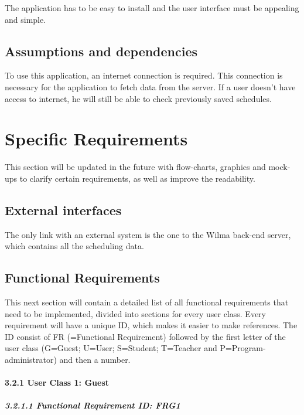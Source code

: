 \documentclass[12pt]{article}
\begin{document}
The application has to be easy to install and the user interface must be
appealing and simple.

\subsection{Assumptions and
dependencies}\label{assumptions-and-dependencies}

To use this application, an internet connection is required. This
connection is necessary for the application to fetch data from the
server. If a user doesn't have access to internet, he will still be able
to check previously saved schedules.

\section{Specific Requirements}\label{specific-requirements}

This section will be updated in the future with flow-charts, graphics
and mock-ups to clarify certain requirements, as well as improve the
readability.

\subsection{External interfaces}\label{external-interfaces}

The only link with an external system is the one to the Wilma back-end
server, which contains all the scheduling data.

\subsection{Functional
Requirements}\label{functional-requirements}

This next section will contain a detailed list of all functional
requirements that need to be implemented, divided into sections for
every user class. Every requirement will have a unique ID, which makes
it easier to make references. The ID consist of FR (=Functional
Requirement) followed by the first letter of the user class (G=Guest;
U=User; S=Student; T=Teacher and P=Program-administrator) and then a
number.

\paragraph{3.2.1 User Class 1: Guest}\label{user-class-1-guest}

\subparagraph{3.2.1.1 Functional Requirement \textbf{ID}:
FRG1\\}\label{functional-requirement-id-frg1}
\end{document}
